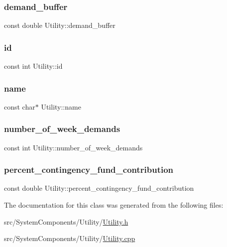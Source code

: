 \subsubsection{\texorpdfstring{demand\+\_\+buffer}{demand\_buffer}}
{\footnotesize\ttfamily const double Utility\+::demand\+\_\+buffer}

\mbox{\label{classUtility_ad41c4ea5c911c5000452a3371cd65d5f}} 
\subsubsection{\texorpdfstring{id}{id}}
{\footnotesize\ttfamily const int Utility\+::id}

\mbox{\label{classUtility_ad0ce5c179a7f5ceb46d4fcae08dbfb47}} 
\subsubsection{\texorpdfstring{name}{name}}
{\footnotesize\ttfamily const char$\ast$ Utility\+::name}

\mbox{\label{classUtility_a0548db3746582251082aa430db49dad0}} 
\subsubsection{\texorpdfstring{number\+\_\+of\+\_\+week\+\_\+demands}{number\_of\_week\_demands}}
{\footnotesize\ttfamily const int Utility\+::number\+\_\+of\+\_\+week\+\_\+demands}

\mbox{\label{classUtility_a7b1a097ec188be8e7175d058b5e6596c}} 
\subsubsection{\texorpdfstring{percent\+\_\+contingency\+\_\+fund\+\_\+contribution}{percent\_contingency\_fund\_contribution}}
{\footnotesize\ttfamily const double Utility\+::percent\+\_\+contingency\+\_\+fund\+\_\+contribution}



The documentation for this class was generated from the following files\+:\begin{DoxyCompactItemize}
\item 
src/\+System\+Components/\+Utility/\mbox{\hyperlink{Utility_8h}{Utility.\+h}}\item 
src/\+System\+Components/\+Utility/\mbox{\hyperlink{Utility_8cpp}{Utility.\+cpp}}\end{DoxyCompactItemize}
